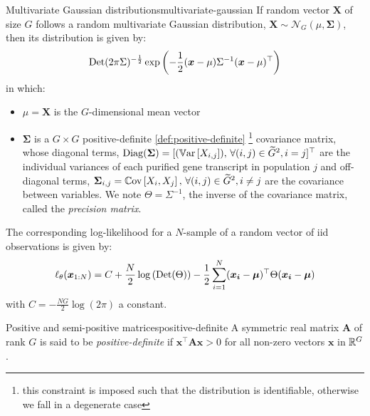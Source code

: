 \begin{Definition}{Multivariate Gaussian distributions}{multivariate-gaussian}
If random vector $\boldsymbol{X}$ of size $G$ follows a random multivariate Gaussian distribution, $\boldsymbol{X} \sim \mathcal{N}_G(\mu, \boldsymbol{\Sigma})$, then its distribution is given by:
\begin{equation*}
    \operatorname*{Det}(2\pi\Sigma)^{-\frac{1}{2}} \exp\left( -\frac{1}{2} (\boldsymbol{x} - \mu) \Sigma^{-1} (\boldsymbol{x} - \mu)^\top\right)
\end{equation*}
in which:
\begin{itemize}
    \item $\mu=\boldsymbol{X}$ is the $G$-dimensional mean vector
    \item $\boldsymbol{\Sigma}$ is a $G\times G$ positive-definite \cref{def:positive-definite} \footnote{this constraint is imposed such that the distribution is identifiable, otherwise we fall in a degenerate case} covariance matrix, whose diagonal terms, $\operatorname*{Diag}(\boldsymbol{\Sigma})=[(\operatorname*{\mathbb{V}\text{ar}}\left[{X_{i,j}}\right]), \, \forall (i, j) \in \widetilde{G}^2, i= j]^\top$ are the individual variances of each purified gene transcript in population $j$ and off-diagonal terms, $\boldsymbol{\Sigma}_{i,j}=\operatorname*{\mathbb{C}\text{ov}}\left[{X_{i}, X_{j}}\right], \, \forall (i, j) \in \widetilde{G}^2, i \neq j$ are the covariance between variables. We note $\Theta=\Sigma^{-1}$, the inverse of the covariance matrix, called the \textit{precision matrix}.
\end{itemize}

The corresponding log-likelihood for a $N$-sample of a random vector of iid observations is given by:
\begin{equation}
    \label{eq:loglikelihood-multivariate-gaussian}
    \ell_{\theta}(\boldsymbol{x}_{1:N})=C + \frac{N}{2} \log\left(\operatorname*{Det}(\Theta)\right) - \frac{1}{2} \sum_{i=1}^N (\boldsymbol{x_i} - \boldsymbol{\mu})^\top \Theta (\boldsymbol{x_i} - \boldsymbol{\mu})
\end{equation}
with $C=-\frac{NG}{2}\log(2\pi)$ a constant.

\end{Definition}

\begin{Definition}{Positive and semi-positive matrices}{positive-definite}
A symmetric real matrix $\boldsymbol{A}$ of rank $G$ is said to be \textit{positive-definite} if $\boldsymbol{x}^\top \boldsymbol{A} \boldsymbol{x} > 0$ for all non-zero vectors $\boldsymbol{x}$ in $\mathbb{R}^G$.
\end{Definition}

